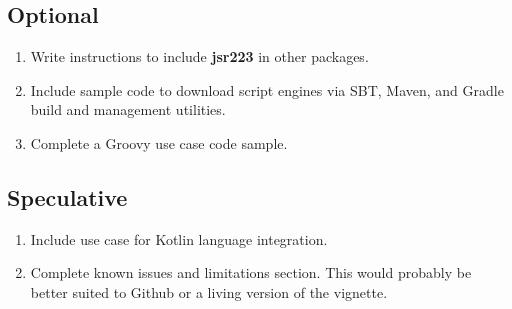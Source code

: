 \subsection{Optional}

\begin{enumerate}
\item Write instructions to include \textbf{jsr223} in other packages.

\item Include sample code to download script engines via SBT, Maven, and Gradle build and management utilities.

\item Complete a Groovy use case code sample.
\end{enumerate}

\subsection{Speculative}

\begin{enumerate}
\item Include use case for Kotlin language integration.

\item Complete known issues and limitations section. This would probably be better suited to Github or a living version of the vignette.
\end{enumerate}

